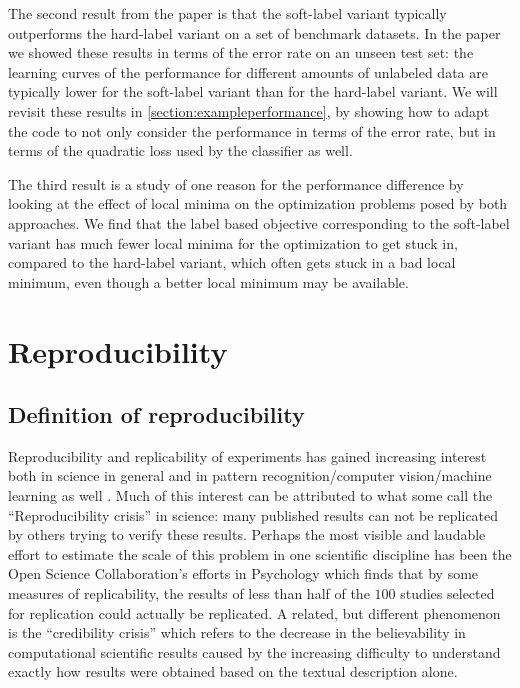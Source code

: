 \documentclass[runningheads,a4paper]{llncs}\usepackage[]{graphicx}\usepackage[]{color}
\begin{document}
The second result from the paper \cite{Krijthe2016a} is that the soft-label variant typically outperforms the hard-label variant on a set of benchmark datasets. In the paper we showed these results in terms of the error rate on an unseen test set: the learning curves of the performance for different amounts of unlabeled data are typically lower for the soft-label variant than for the hard-label variant. We will revisit these results in \cref{section:exampleperformance}, by showing how to adapt the code to not only consider the performance in terms of the error rate, but in terms of the quadratic loss used by the classifier as well.

The third result is a study of one reason for the performance difference by looking at the effect of local minima on the optimization problems posed by both approaches. We find that the label based objective corresponding to the soft-label variant has much fewer local minima for the optimization to get stuck in, compared to the hard-label variant, which often gets stuck in a bad local minimum, even though a better local minimum may be available.

\section{Reproducibility}

\subsection{Definition of reproducibility}
Reproducibility and replicability of experiments has gained increasing interest both in science in general \cite{Goodman2016a} and in pattern recognition/computer vision/machine learning as well \cite{Donoho2009,Drummond2009}. Much of this interest can be attributed to what some call the ``Reproducibility crisis'' in science: many published results can not be replicated by others trying to verify these results. Perhaps the most visible and laudable effort to estimate the scale of this problem in one scientific discipline has been the Open Science Collaboration's efforts in Psychology \cite{OpenScienceCollaboration2015} which finds that by some measures of replicability, the results of less than half of the $100$ studies selected for replication could actually be replicated. A related, but different phenomenon is the ``credibility crisis'' \cite{Donoho2009} which refers to the decrease in the believability in computational scientific results caused by the increasing difficulty to understand exactly how results were obtained based on the textual description alone.
\end{document}
